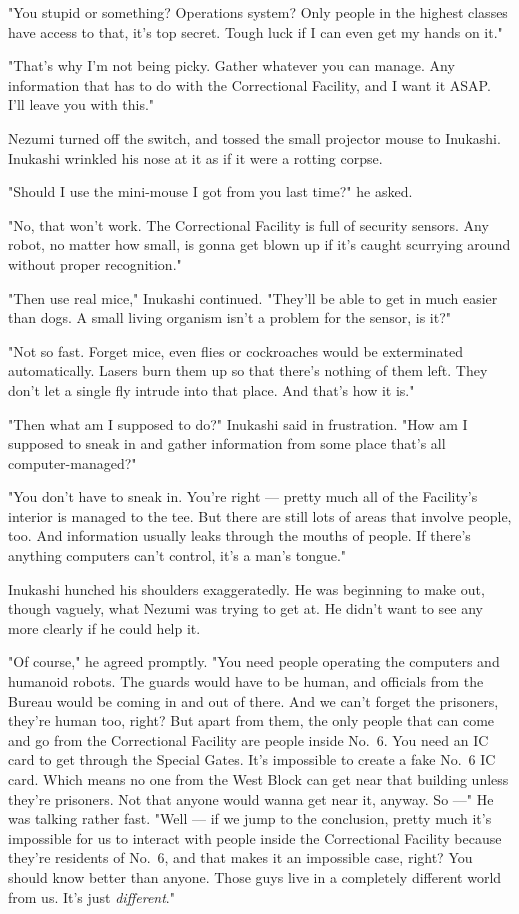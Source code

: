 "You stupid or something? Operations system? Only people in the highest
classes have access to that, it's top secret. Tough luck if I can even
get my hands on it."

"That's why I'm not being picky. Gather whatever you can manage. Any
information that has to do with the Correctional Facility, and I want it
ASAP. I'll leave you with this."

Nezumi turned off the switch, and tossed the small projector mouse to
Inukashi. Inukashi wrinkled his nose at it as if it were a rotting
corpse.

"Should I use the mini-mouse I got from you last time?" he asked.

"No, that won't work. The Correctional Facility is full of security
sensors. Any robot, no matter how small, is gonna get blown up if it's
caught scurrying around without proper recognition."

"Then use real mice," Inukashi continued. "They'll be able to get in
much easier than dogs. A small living organism isn't a problem for the
sensor, is it?"

"Not so fast. Forget mice, even flies or cockroaches would be
exterminated automatically. Lasers burn them up so that there's nothing
of them left. They don't let a single fly intrude into that place. And
that's how it is."

"Then what am I supposed to do?" Inukashi said in frustration. "How am I
supposed to sneak in and gather information from some place that's all
computer-managed?"

"You don't have to sneak in. You're right --- pretty much all of the
Facility's interior is managed to the tee. But there are still lots of
areas that involve people, too. And information usually leaks through
the mouths of people. If there's anything computers can't control, it's
a man's tongue."

Inukashi hunched his shoulders exaggeratedly. He was beginning to make
out, though vaguely, what Nezumi was trying to get at. He didn't want to
see any more clearly if he could help it.

"Of course," he agreed promptly. "You need people operating the
computers and humanoid robots. The guards would have to be human, and
officials from the Bureau would be coming in and out of there. And we
can't forget the prisoners, they're human too, right? But apart from
them, the only people that can come and go from the Correctional
Facility are people inside No.~6. You need an IC card to get through the
Special Gates. It's impossible to create a fake No.~6 IC card. Which
means no one from the West Block can get near that building unless
they're prisoners. Not that anyone would wanna get near it, anyway. So
---" He was talking rather fast. "Well --- if we jump to the conclusion,
pretty much it's impossible for us to interact with people inside the
Correctional Facility because they're residents of No.~6, and that makes
it an impossible case, right? You should know better than anyone. Those
guys live in a completely different world from us. It's just \emph{different}."

